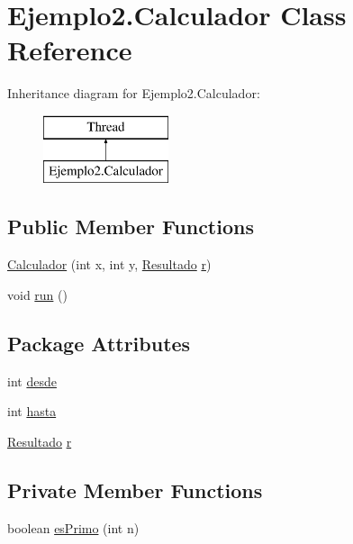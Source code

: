 \hypertarget{class_ejemplo2_1_1_calculador}{}\section{Ejemplo2.\+Calculador Class Reference}
\label{class_ejemplo2_1_1_calculador}
Inheritance diagram for Ejemplo2.\+Calculador\+:\begin{figure}[H]
\begin{center}
\leavevmode
\includegraphics[height=2.000000cm]{class_ejemplo2_1_1_calculador}
\end{center}
\end{figure}
\subsection*{Public Member Functions}
\begin{DoxyCompactItemize}
\item 
\mbox{\hyperlink{class_ejemplo2_1_1_calculador_a0e218d7f911655373271137282b54e30}{Calculador}} (int x, int y, \mbox{\hyperlink{class_ejemplo2_1_1_resultado}{Resultado}} \mbox{\hyperlink{class_ejemplo2_1_1_calculador_abca6ebfaa258c5e7c77c30751f27fb64}{r}})
\item 
void \mbox{\hyperlink{class_ejemplo2_1_1_calculador_a0b410188aefa5c53ddd250952ff2b8a9}{run}} ()
\end{DoxyCompactItemize}
\subsection*{Package Attributes}
\begin{DoxyCompactItemize}
\item 
int \mbox{\hyperlink{class_ejemplo2_1_1_calculador_ae17892240dfa6e7eef00191f27759d95}{desde}}
\item 
int \mbox{\hyperlink{class_ejemplo2_1_1_calculador_a8d89146305d07fda007f0cb69038c62c}{hasta}}
\item 
\mbox{\hyperlink{class_ejemplo2_1_1_resultado}{Resultado}} \mbox{\hyperlink{class_ejemplo2_1_1_calculador_abca6ebfaa258c5e7c77c30751f27fb64}{r}}
\end{DoxyCompactItemize}
\subsection*{Private Member Functions}
\begin{DoxyCompactItemize}
\item 
boolean \mbox{\hyperlink{class_ejemplo2_1_1_calculador_aeef834dafd4eaa5ddebabe9b2db9b628}{es\+Primo}} (int n)
\end{DoxyCompactItemize}


